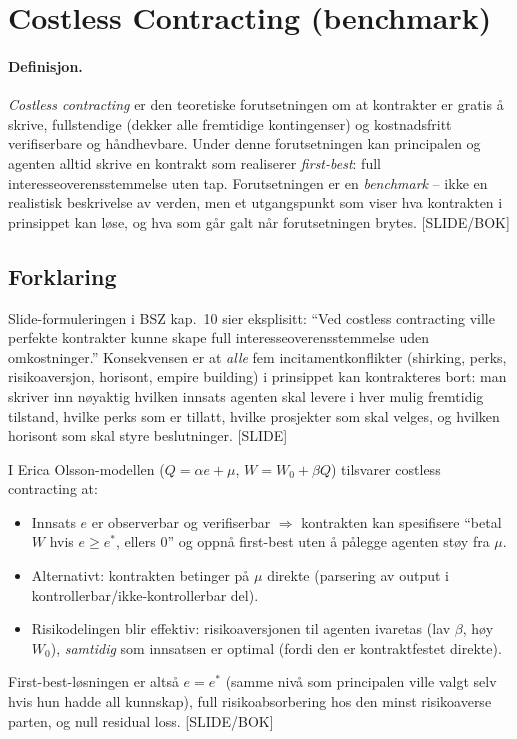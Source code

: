 \section{Costless Contracting (benchmark)}\label{thr:costless-contracting}

\paragraph{Definisjon.} \emph{Costless contracting} er den teoretiske forutsetningen om at kontrakter er gratis å skrive, fullstendige (dekker alle fremtidige kontingenser) og kostnadsfritt verifiserbare og håndhevbare. Under denne forutsetningen kan principalen og agenten alltid skrive en kontrakt som realiserer \emph{first-best}: full interesseoverensstemmelse uten tap. Forutsetningen er en \emph{benchmark} -- ikke en realistisk beskrivelse av verden, men et utgangspunkt som viser hva kontrakten i prinsippet kan løse, og hva som går galt når forutsetningen brytes. [SLIDE/BOK]

\subsection*{Forklaring}

Slide-formuleringen i BSZ kap.~10 sier eksplisitt: ``Ved costless contracting ville perfekte kontrakter kunne skape full interesseoverensstemmelse uden omkostninger.'' Konsekvensen er at \emph{alle} fem incitamentkonflikter (shirking, perks, risikoaversjon, horisont, empire building) i prinsippet kan kontrakteres bort: man skriver inn nøyaktig hvilken innsats agenten skal levere i hver mulig fremtidig tilstand, hvilke perks som er tillatt, hvilke prosjekter som skal velges, og hvilken horisont som skal styre beslutninger. [SLIDE]

I Erica Olsson-modellen ($Q = \alpha e + \mu$, $W = W_0 + \beta Q$) tilsvarer costless contracting at:
\begin{itemize}
\item Innsats $e$ er observerbar og verifiserbar $\Rightarrow$ kontrakten kan spesifisere ``betal $W$ hvis $e \ge e^\ast$, ellers $0$'' og oppnå first-best uten å pålegge agenten støy fra $\mu$.
\item Alternativt: kontrakten betinger på $\mu$ direkte (parsering av output i kontrollerbar/ikke-kontrollerbar del).
\item Risikodelingen blir effektiv: risikoaversjonen til agenten ivaretas (lav $\beta$, høy $W_0$), \emph{samtidig} som innsatsen er optimal (fordi den er kontraktfestet direkte).
\end{itemize}
First-best-løsningen er altså $e = e^\ast$ (samme nivå som principalen ville valgt selv hvis hun hadde all kunnskap), full risikoabsorbering hos den minst risiko\-averse parten, og null residual loss. [SLIDE/BOK]

